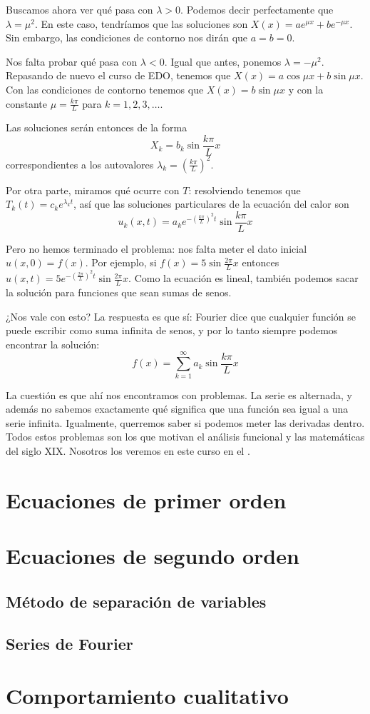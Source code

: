 \documentclass[palatino]{apuntes}
\begin{document}
Buscamos ahora ver qué pasa con $λ > 0$. Podemos decir perfectamente que $λ = μ^2$. En este caso, tendríamos que las soluciones son $X(x) = ae^{μx} + be^{-μx}$. Sin embargo, las condiciones de contorno nos dirán que $a = b = 0$.

Nos falta probar qué pasa con $λ < 0$. Igual que antes, ponemos $λ = -μ^2$. Repasando de nuevo el curso de EDO, tenemos que $X(x) = a \cos μx + b \sin μx$. Con las condiciones de contorno tenemos que $X(x) = b \sin μx$ y con la constante $μ = \frac{kπ}{L}$ para $k = 1,2,3,\dotsc$.

Las soluciones serán entonces de la forma \[ X_k = b_k \sin \frac{kπ}{L} x\] correspondientes a los autovalores $λ_k = \left(\frac{kπ}{L}\right)^2$.

Por otra parte, miramos qué ocurre con $T$: resolviendo tenemos que $T_k(t) = c_k e^{λ_k t}$, así que las soluciones particulares de la ecuación del calor son \[ u_k(x,t) = a_k e^{-\left(\frac{kπ}{L}\right)^2t} \sin \frac{kπ}{L} x\]

Pero no hemos terminado el problema: nos falta meter el dato inicial $u(x,0) = f(x)$. Por ejemplo, si $f(x) = 5 \sin \frac{2π}{L} x$ entonces $u(x,t) = 5 e^{-\left(\frac{2π}{L}\right)^2t} \sin \frac{2π}{L} x$. Como la ecuación es lineal, también podemos sacar la solución para funciones que sean sumas de senos.

¿Nos vale con esto? La respuesta es que sí: Fourier dice que cualquier función se puede escribir como suma infinita de senos, y por lo tanto siempre podemos encontrar la solución: \[ f(x) = \sum_{k=1}^∞ a_k \sin \frac{kπ}{L} x\]

La cuestión es que ahí nos encontramos con problemas. La serie es alternada, y además no sabemos exactamente qué significa que una función sea igual a una serie infinita. Igualmente, querremos saber si podemos meter las derivadas dentro. Todos estos problemas son los que motivan el análisis funcional y las matemáticas del siglo XIX. Nosotros los veremos en este curso en el .


\chapter{Ecuaciones de primer orden}

\chapter{Ecuaciones de segundo orden}
\label{chap:EcuacionesSegundoOrden}

\section{Método de separación de variables}

\section{Series de Fourier}

\chapter{Comportamiento cualitativo}

\appendix

{}
\printindex
\end{document}
